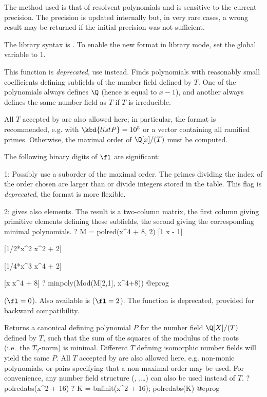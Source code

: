  The method used is that of resolvent polynomials and is
sensitive to the current precision. The precision is updated internally but,
in very rare cases, a wrong result may be returned if the initial precision
was not sufficient.

The library syntax is .
To enable the new format in library mode,
set the global variable  to $1$.

\label{se:polred}
This function is \emph{deprecated}, use  instead.
Finds polynomials with reasonably small coefficients defining subfields of
the number field defined by $T$. One of the polynomials always defines $\Q$
(hence is equal to $x-1$), and another always defines the same number field
as $T$ if $T$ is irreducible.

All $T$ accepted by  are also allowed here;
in particular, the format \kbd{[T, listP]} is recommended, e.g. with
$\kbd{listP} = 10^5$ or a vector containing all ramified primes. Otherwise,
the maximal order of $\Q[x]/(T)$ must be computed.

The following binary digits of $\fl$ are significant:

1: Possibly use a suborder of the maximal order. The
primes dividing the index of the order chosen are larger than
 or divide integers stored in the  table.
This flag is \emph{deprecated}, the \kbd{[T, listP]} format is more
flexible.

2: gives also elements. The result is a two-column matrix, the first column
giving primitive elements defining these subfields, the second giving the
corresponding minimal polynomials.
\bprog
? M = polred(x^4 + 8, 2)
[1 x - 1]

[1/2*x^2 x^2 + 2]

[1/4*x^3 x^4 + 2]

[x x^4 + 8]
? minpoly(Mod(M[2,1], x^4+8))
@eprog

 ($\fl = 0$). Also available is
 ($\fl = 2$). The function  is
deprecated, provided for backward compatibility.

\label{se:polredabs}
Returns a canonical defining polynomial $P$ for the number field
$\Q[X]/(T)$ defined by $T$, such that the sum of the squares of the modulus
of the roots (i.e.~the $T_2$-norm) is minimal. Different $T$ defining
isomorphic number fields will yield the same $P$. All $T$ accepted by
 are also allowed here, e.g. non-monic polynomials, or pairs
\kbd{[T, listP]} specifying that a non-maximal order may be used. For
convenience, any number field structure (, ,\dots) can also
be used instead of $T$.
\bprog
? polredabs(x^2 + 16)
? K = bnfinit(x^2 + 16); polredabs(K)
@eprog

